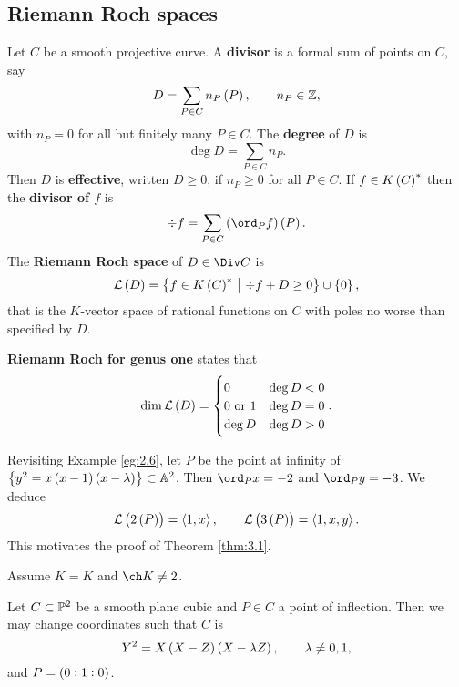\subsection{Riemann Roch spaces}

\begin{definition*}
Let $ C $ be a smooth projective curve. A \textbf{divisor} is a formal sum of points on $ C $, say
$$ D = \sum_{P \in C} n_P\br{P}, \qquad n_P \in \ZZ, $$
with $ n_P = 0 $ for all but finitely many $ P \in C $. The \textbf{degree} of $ D $ is
$$ \deg D = \sum_{P \in C} n_P. $$
Then $ D $ is \textbf{effective}, written $ D \ge 0 $, if $ n_P \ge 0 $ for all $ P \in C $. If $ f \in K\br{C}^* $ then the \textbf{divisor of $ f $} is
$$ \div f = \sum_{P \in C} \br{\ord_P f}\br{P}. $$
The \textbf{Riemann Roch space} of $ D \in \Div C $ is
$$ \LLL\br{D} = \cbr{f \in K\br{C}^* \st \div f + D \ge 0} \cup \cbr{0}, $$
that is the $ K $-vector space of rational functions on $ C $ with poles no worse than specified by $ D $.
\end{definition*}

\textbf{Riemann Roch for genus one} states that
$$ \dim \LLL\br{D} =
\begin{cases}
0 & \deg D < 0 \\
0 \ \text{or} \ 1 & \deg D = 0 \\
\deg D & \deg D > 0
\end{cases}.
$$

\begin{example*}
Revisiting Example \ref{eg:2.6}, let $ P $ be the point at infinity of $ \cbr{y^2 = x\br{x - 1}\br{x - \lambda}} \subset \AA^2 $. Then $ \ord_P x = -2 $ and $ \ord_P y = -3 $. We deduce
$$ \LLL\br{2\br{P}} = \abr{1, x}, \qquad \LLL\br{3\br{P}} = \abr{1, x, y}. $$
This motivates the proof of Theorem \ref{thm:3.1}.
\end{example*}

\pagebreak


Assume $ K = \overline{K} $ and $ \ch K \ne 2 $.

\begin{proposition}
\label{prop:2.7}
Let $ C \subset \mathbb{P}^2 $ be a smooth plane cubic and $ P \in C $ a point of inflection. Then we may change coordinates such that $ C $ is
$$ Y^2 = X\br{X - Z}\br{X - \lambda Z}, \qquad \lambda \ne 0, 1, $$
and $ P = \br{0 : 1 : 0} $.
\end{proposition}

